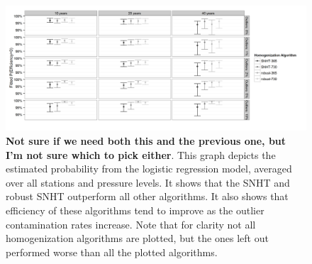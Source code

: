 \documentclass[12pt]{article}
\begin{document}
\begin{figure}[h!]
	\centering
	\includegraphics[width=\textwidth]{Efficiency_Model_Plot_BW_SNHT_only}
	\caption{\textbf{Not sure if we need both this and the previous one, but I'm not sure which to pick either}.  This graph depicts the estimated probability from the logistic regression model, averaged over all stations and pressure levels.  It shows that the SNHT and robust SNHT outperform all other algorithms.  It also shows that efficiency of these algorithms tend to improve as the outlier contamination rates increase.  Note that for clarity not all homogenization algorithms are plotted, but the ones left out performed worse than all the plotted algorithms.}
	\label{fig:homFitEff2}
\end{figure}
\end{document}

